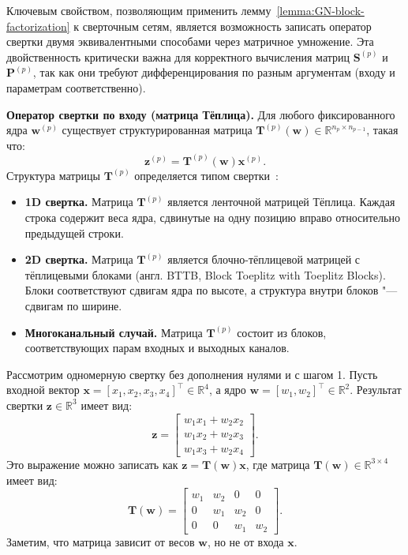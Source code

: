 Ключевым свойством, позволяющим применить лемму~\ref{lemma:GN-block-factorization} к сверточным сетям, является возможность записать оператор свертки двумя эквивалентными способами через матричное умножение. Эта двойственность критически важна для корректного вычисления матриц $\mathbf{S}^{(p)}$ и $\mathbf{P}^{(p)}$, так как они требуют дифференцирования по разным аргументам (входу и параметрам соответственно).

\textbf{Оператор свертки по входу (матрица Тёплица).} Для любого фиксированного ядра $\mathbf{w}^{(p)}$ существует структурированная матрица $\mathbf{T}^{(p)}(\mathbf{w}) \in \mathbb{R}^{n_p \times n_{p-1}}$, такая что:
\begin{equation}
    \label{eq:cnn-toeplitz-def}
    \mathbf{z}^{(p)} = \mathbf{T}^{(p)}(\mathbf{w})  \mathbf{x}^{(p)}.
\end{equation}
Структура матрицы $\mathbf{T}^{(p)}$ определяется типом свертки~\cite{singh2023hessian}:
\begin{itemize}
    \item \textbf{1D свертка.} Матрица $\mathbf{T}^{(p)}$ является ленточной матрицей Тёплица. Каждая строка содержит веса ядра, сдвинутые на одну позицию вправо относительно предыдущей строки.
    \item \textbf{2D свертка.} Матрица $\mathbf{T}^{(p)}$ является блочно-тёплицевой матрицей с тёплицевыми блоками (англ. BTTB, Block Toeplitz with Toeplitz Blocks). Блоки соответствуют сдвигам ядра по высоте, а структура внутри блоков "--- сдвигам по ширине.
    \item \textbf{Многоканальный случай.} Матрица $\mathbf{T}^{(p)}$ состоит из блоков, соответствующих парам входных и выходных каналов.
\end{itemize}

\begin{example}
    Рассмотрим одномерную свертку без дополнения нулями и с шагом 1.
    Пусть входной вектор $\mathbf{x} = [x_1, x_2, x_3, x_4]^\top \in \mathbb{R}^4$, а ядро $\mathbf{w} = [w_1, w_2]^\top \in \mathbb{R}^2$.
    Результат свертки $\mathbf{z} \in \mathbb{R}^3$ имеет вид:
    \[
    \mathbf{z} = 
    \begin{bmatrix}
    w_1 x_1 + w_2 x_2 \\
    w_1 x_2 + w_2 x_3 \\
    w_1 x_3 + w_2 x_4
    \end{bmatrix}.
    \]
    Это выражение можно записать как $\mathbf{z} = \mathbf{T}(\mathbf{w}) \mathbf{x}$, где матрица $\mathbf{T}(\mathbf{w}) \in \mathbb{R}^{3 \times 4}$ имеет вид:
    \begin{equation}
    \label{eq:toeplitz-example}
    \mathbf{T}(\mathbf{w}) = 
    \begin{bmatrix}
    w_1 & w_2 & 0 & 0 \\
    0 & w_1 & w_2 & 0 \\
    0 & 0 & w_1 & w_2
    \end{bmatrix}.
    \end{equation}
    Заметим, что матрица зависит от весов $\mathbf{w}$, но не от входа $\mathbf{x}$.
\end{example}

